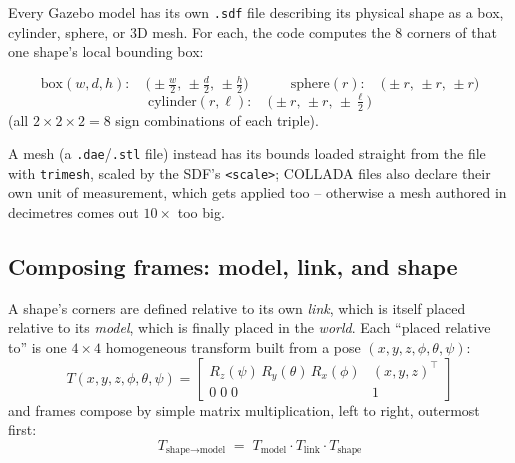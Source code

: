 \documentclass[11pt]{article}
\begin{document}
Every Gazebo model has its own \texttt{.sdf} file describing its physical
shape as a box, cylinder, sphere, or 3D mesh. For each, the code computes
the 8 corners of that one shape's local bounding box:

\[
\text{box}(w,d,h):\quad \Big(\pm\tfrac{w}{2},\, \pm\tfrac{d}{2},\, \pm\tfrac{h}{2}\Big)
\qquad\quad
\text{sphere}(r):\quad \big(\pm r,\, \pm r,\, \pm r\big)
\]
\[
\text{cylinder}(r,\ell):\quad \Big(\pm r,\, \pm r,\, \pm\tfrac{\ell}{2}\Big)
\]
(all $2\times2\times2=8$ sign combinations of each triple).

\begin{center}
\end{center}

A mesh (a \texttt{.dae}/\texttt{.stl} file) instead has its bounds loaded
straight from the file with \texttt{trimesh}, scaled by the SDF's
\texttt{<scale>}; COLLADA files also declare their own unit of measurement,
which gets applied too -- otherwise a mesh authored in decimetres comes out
$10\times$ too big.

\subsection{Composing frames: model, link, and shape}

A shape's corners are defined relative to its own \emph{link}, which is
itself placed relative to its \emph{model}, which is finally placed in the
\emph{world}. Each ``placed relative to'' is one $4\times4$ homogeneous
transform built from a pose $(x,y,z,\phi,\theta,\psi)$:
\[
T(x,y,z,\phi,\theta,\psi) = \begin{bmatrix} R_z(\psi)\,R_y(\theta)\,R_x(\phi) & (x,y,z)^{\top} \\ 0 \; 0 \; 0 & 1 \end{bmatrix}
\]
and frames compose by simple matrix multiplication, left to right, outermost
first:
\[
T_{\text{shape}\to\text{model}} \;=\; T_{\text{model}} \cdot T_{\text{link}} \cdot T_{\text{shape}}
\]
\end{document}
